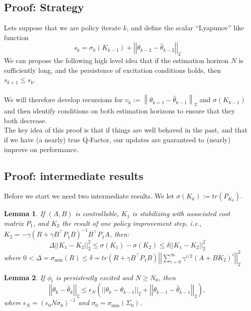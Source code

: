 \documentclass{article}[12pt]
\newtheorem{lemma}{Lemma}
\newcommand{\norm}[1]{\left|\left|#1\right|\right|}
\begin{document}
\subsection{Proof: Strategy}
Lets suppose that we are policy iterate $k$, and define the scalar ``Lyapunov'' like function 
\begin{equation}
    s_k = \sigma_k(K_{k-1}) + \norm{\theta_{k-2}-\hat{\theta}_{k-2}}_2
\end{equation}
We can propose the following high level idea that if the estimation horizon $N$ is sufficiently long, and the persistence of excitation conditions holds, then $s_{k+1} \leq s_k$.\\ \\
We will therefore develop recursions for $v_{k}:=\left\|\theta_{k=1}-\hat{\theta}_{k-1}\right\|_{2}$ and $\sigma\left(K_{k-1}\right)$ and then identify conditions on both estimation horizons to ensure that they both decrease. \\
The key idea of this proof is that if things are well behaved in the past, and that if we have (a nearly) true Q-Factor, our updates are guaranteed to (nearly) improve on performance.

\subsection{Proof: intermediate results}
Before we start we need two intermediate results.  We let $\sigma(K_k):=tr(P_{K_k})$.

\begin{lemma}
If $(A,B)$ is controllable, $K_1$ is stabilizing with associated cost matrix $P_1$, and $K_2$ the result of one policy improvement step, i.e., $K_2 = -\gamma(R+\gamma B^\top P_1 B)^{-1}B^\top P_1 A$, then: 
\[
\Delta\norm{K_1-K_2}_2^2\leq \sigma(K_1)-\sigma(K_2)\leq \delta\norm{K_1-K_2}_2^2 
\]
where
$0 < \Delta = \sigma_{\min}(R)\leq \delta = tr(R+\gamma B^\top P_1 B)\norm{\sum_{i=0}^\infty \gamma^{i/2}(A+BK_2)^i}^2_2$
\end{lemma}
\begin{lemma}
If $\phi_t$ is persistently excited and $N\geq N_0$, then
\[
\norm{\theta_k-\hat{\theta}_k}_2 \leq \epsilon_N\left(\norm{\theta_k - \theta_{k-1}}_2+\norm{\theta_{k-1}-\hat{\theta}_{k-1}}_2\right),
\]
where $\epsilon_N = (\epsilon_0 N \sigma_0)^{-1}$ and $\sigma_0 = \sigma_{\min}(\Sigma_0)$.
\end{lemma}

\newpage
\end{document}
